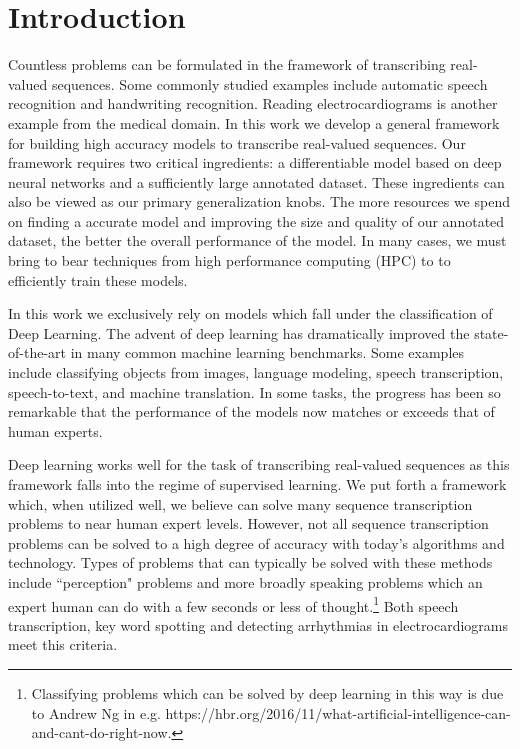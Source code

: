 \chapter{Introduction}

Countless problems can be formulated in the framework of transcribing
real-valued sequences. Some commonly studied examples include automatic speech
recognition and handwriting recognition. Reading electrocardiograms is another
example from the medical domain. In this work we develop a general framework
for building high accuracy models to transcribe real-valued sequences. Our
framework requires two critical ingredients: a differentiable model based on
deep neural networks and a sufficiently large annotated dataset. These
ingredients can also be viewed as our primary generalization knobs. The more
resources we spend on finding a accurate model and improving the size and
quality of our annotated dataset, the better the overall performance of the
model. In many cases, we must bring to bear techniques from high performance
computing (HPC) to to efficiently train these models.

In this work we exclusively rely on models which fall under the classification
of Deep Learning. The advent of deep learning has dramatically improved the
state-of-the-art in many common machine learning benchmarks. Some examples
include classifying objects from images, language modeling, speech
transcription, speech-to-text, and machine translation. In some tasks, the
progress has been so remarkable that the performance of the models now matches
or exceeds that of human experts.

Deep learning works well for the task of transcribing real-valued sequences as
this framework falls into the regime of supervised learning. We put forth a
framework which, when utilized well, we believe can solve many sequence
transcription problems to near human expert levels. However, not all sequence
transcription problems can be solved to a high degree of accuracy with today's
algorithms and technology. Types of problems that can typically be solved with
these methods include ``perception" problems and more broadly speaking problems
which an expert human can do with a few seconds or less of
thought.\footnote{Classifying problems which can be solved by deep learning in
this way is due to Andrew Ng in e.g.
https://hbr.org/2016/11/what-artificial-intelligence-can-and-cant-do-right-now.}
Both speech transcription, key word spotting and detecting arrhythmias in
electrocardiograms meet this criteria.

